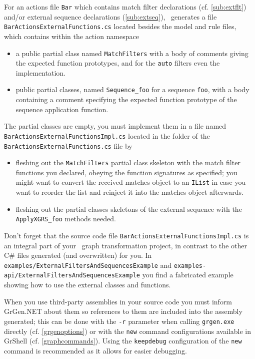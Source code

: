 For an actions file \texttt{Bar} which contains match filter declarations (cf. \ref{sub:extflt}) and/or external sequence declarations (\ref{sub:extseq}), \GrG~generates a file \texttt{BarActionsExternalFunctions.cs} located besides the model and rule files, which contains within the action namespace 
\begin{itemize}
	\item a public partial class named \texttt{MatchFilters} with a body of comments giving the expected function prototypes, and for the \texttt{auto} filters even the implementation.
	\item public partial classes, named \texttt{Sequence\_foo} for a sequence \texttt{foo}, with a body containing a comment specifying the expected function prototype of the sequence application function.
\end{itemize}

\noindent The partial classes are empty, you must implement them in a file named \texttt{BarActionsExternal\-FunctionsImpl.cs} located in the folder of the \texttt{BarActionsExternalFunctions.cs} file by
\begin{itemize}
	\item fleshing out the \texttt{MatchFilters} partial class skeleton with the match filter functions you declared, obeying the function signatures as specified; you might want to convert the received matches object to an \texttt{IList} in case you want to reorder the list and reinject it into the matches object afterwards.
	\item fleshing out the partial classes skeletons of the external sequence with the \texttt{ApplyXGRS\_foo} methods needed.
\end{itemize}

\noindent Don't forget that the source code file \texttt{BarActionsExternalFunctionsImpl.cs} is an integral part of your \GrG~graph transformation project, in contrast to the other C\# files generated (and overwritten) for you.
In \texttt{examples/ExternalFiltersAndSequencesExample} and \texttt{examples-api/ExternalFiltersAndSequencesExample}
you find a fabricated example showing how to use the external classes and functions.

When you use third-party assemblies in your source code you must inform GrGen.NET about them so references to them are included into the assembly generated; this can be done with the \texttt{-r} parameter when calling \texttt{grgen.exe} directly (cf. \ref{grgenoptions}) or with the \texttt{new} command configurations available in GrShell (cf. \ref{graphcommands}). Using the \texttt{keepdebug} configuration of the \texttt{new} command is recommended as it allows for easier debugging.

